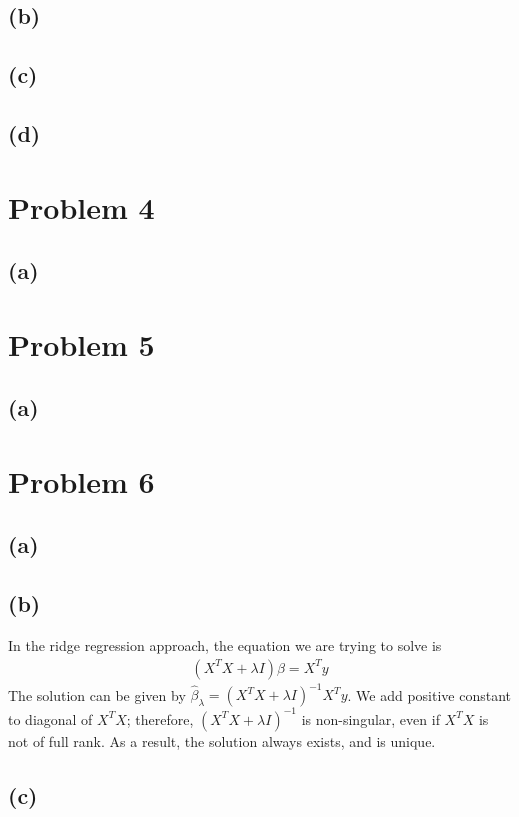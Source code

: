 \documentclass[pra,groupedaddress,amsmath,amssymb, column]{revtex4}
\begin{document}
\subsection*{(b)}

\subsection*{(c)}

\subsection*{(d)}



\section*{Problem 4}
\subsection*{(a)}

\section*{Problem 5}
\subsection*{(a)}

\section*{Problem 6}
\subsection*{(a)}

\subsection*{(b)}
In the ridge regression approach, the equation we are trying to solve is 
\begin{align}
(X^TX +  \lambda I)\beta = X^T y
\end{align}
The solution can be given by $\hat{\beta}_{\lambda}=(X^TX +  \lambda I)^{-1}X^T y$.  We add positive constant to diagonal of $X^TX$; therefore, $(X^TX +  \lambda I)^{-1}$ is non-singular, even if $X^TX$ is not of full rank. As a result, the solution always exists, and is unique.
\subsection*{(c)}
\end{document}
